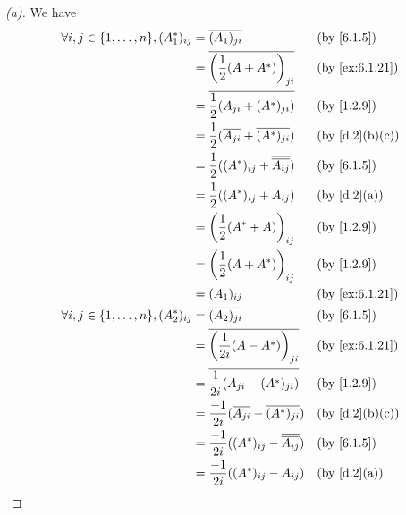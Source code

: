 \begin{proof}[(a)]
  We have
  \begin{align*}
    \forall i, j \in \set{1, \dots, n}, (A_1^*)_{i j} & = \conj{(A_1)_{j i}}                                   &  & \by{6.1.5}     \\
                                                      & = \conj{\pa{\dfrac{1}{2} (A + A^*)}_{j i}}             &  & \by{ex:6.1.21} \\
                                                      & = \conj{\dfrac{1}{2} (A_{j i} + (A^*)_{j i})}          &  & \by{1.2.9}     \\
                                                      & = \dfrac{1}{2} (\conj{A_{j i}} + \conj{(A^*)_{j i}})   &  & \by{d.2}[b,c]  \\
                                                      & = \dfrac{1}{2} ((A^*)_{i j} + \conj{\conj{A_{i j}}})   &  & \by{6.1.5}     \\
                                                      & = \dfrac{1}{2} ((A^*)_{i j} + A_{i j})                 &  & \by{d.2}[a]    \\
                                                      & = \pa{\dfrac{1}{2} (A^* + A)}_{i j}                    &  & \by{1.2.9}     \\
                                                      & = \pa{\dfrac{1}{2} (A + A^*)}_{i j}                    &  & \by{1.2.9}     \\
                                                      & = (A_1)_{i j}                                          &  & \by{ex:6.1.21} \\
    \forall i, j \in \set{1, \dots, n}, (A_2^*)_{i j} & = \conj{(A_2)_{j i}}                                   &  & \by{6.1.5}     \\
                                                      & = \conj{\pa{\dfrac{1}{2i} (A - A^*)}_{j i}}            &  & \by{ex:6.1.21} \\
                                                      & = \conj{\dfrac{1}{2i} (A_{j i} - (A^*)_{j i})}         &  & \by{1.2.9}     \\
                                                      & = \dfrac{-1}{2i} (\conj{A_{j i}} - \conj{(A^*)_{j i}}) &  & \by{d.2}[b,c]  \\
                                                      & = \dfrac{-1}{2i} ((A^*)_{i j} - \conj{\conj{A_{i j}}}) &  & \by{6.1.5}     \\
                                                      & = \dfrac{-1}{2i} ((A^*)_{i j} - A_{i j})               &  & \by{d.2}[a]    \\

\end{align*}
\end{proof}
